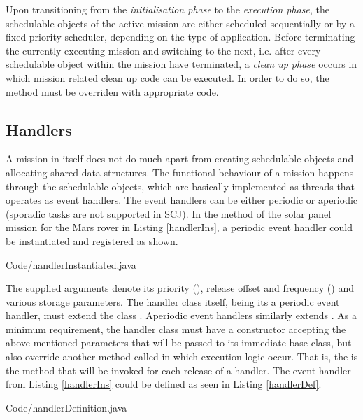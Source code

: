 Upon transitioning from the \textit{initialisation phase} to the \textit{execution phase}, the schedulable objects of the active mission are either scheduled sequentially or by a fixed-priority scheduler, depending on the type of application. Before terminating the currently executing mission and switching to the next, i.e. after every schedulable object within the mission have terminated, a \textit{clean up phase} occurs in which mission related clean up code can be executed. In order to do so, the  method must be overriden with appropriate code.

\subsection{Handlers}
\label{subsection:handlers}
A mission in itself does not do much apart from creating schedulable objects and allocating shared data structures. The functional behaviour of a mission happens through the schedulable objects, which are basically implemented as threads that operates as event handlers. The event handlers can be either periodic or aperiodic (sporadic tasks are not supported in SCJ). In the  method of the solar panel mission for the Mars rover in Listing \ref{handlerIns}, a periodic event handler could be instantiated and registered as shown.


{Code/handlerInstantiated.java}

The supplied arguments denote its priority (), release offset and frequency () and various storage parameters. The handler class itself, being its a periodic event handler, must extend the class . Aperiodic event handlers similarly extends . As a minimum requirement, the handler class must have a constructor accepting the above mentioned parameters that will be passed to its immediate base class, but also override another method called  in which execution logic occur. That is, the  is the method that will be invoked for each release of a handler. The  event handler from Listing \ref{handlerIns} could be defined as seen in Listing \ref{handlerDef}.


{Code/handlerDefinition.java}

